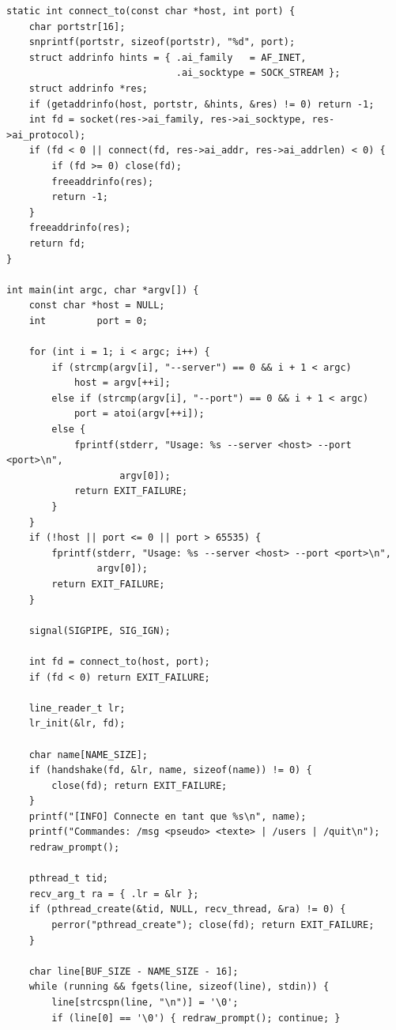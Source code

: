 \documentclass[12pt,a4paper]{article}
\begin{document}
\begin{lstlisting}[caption={\texttt{client.c}, client interactif du hub}]
static int connect_to(const char *host, int port) {
    char portstr[16];
    snprintf(portstr, sizeof(portstr), "%d", port);
    struct addrinfo hints = { .ai_family   = AF_INET,
                              .ai_socktype = SOCK_STREAM };
    struct addrinfo *res;
    if (getaddrinfo(host, portstr, &hints, &res) != 0) return -1;
    int fd = socket(res->ai_family, res->ai_socktype, res->ai_protocol);
    if (fd < 0 || connect(fd, res->ai_addr, res->ai_addrlen) < 0) {
        if (fd >= 0) close(fd);
        freeaddrinfo(res);
        return -1;
    }
    freeaddrinfo(res);
    return fd;
}

int main(int argc, char *argv[]) {
    const char *host = NULL;
    int         port = 0;

    for (int i = 1; i < argc; i++) {
        if (strcmp(argv[i], "--server") == 0 && i + 1 < argc)
            host = argv[++i];
        else if (strcmp(argv[i], "--port") == 0 && i + 1 < argc)
            port = atoi(argv[++i]);
        else {
            fprintf(stderr, "Usage: %s --server <host> --port <port>\n",
                    argv[0]);
            return EXIT_FAILURE;
        }
    }
    if (!host || port <= 0 || port > 65535) {
        fprintf(stderr, "Usage: %s --server <host> --port <port>\n",
                argv[0]);
        return EXIT_FAILURE;
    }

    signal(SIGPIPE, SIG_IGN);

    int fd = connect_to(host, port);
    if (fd < 0) return EXIT_FAILURE;

    line_reader_t lr;
    lr_init(&lr, fd);

    char name[NAME_SIZE];
    if (handshake(fd, &lr, name, sizeof(name)) != 0) {
        close(fd); return EXIT_FAILURE;
    }
    printf("[INFO] Connecte en tant que %s\n", name);
    printf("Commandes: /msg <pseudo> <texte> | /users | /quit\n");
    redraw_prompt();

    pthread_t tid;
    recv_arg_t ra = { .lr = &lr };
    if (pthread_create(&tid, NULL, recv_thread, &ra) != 0) {
        perror("pthread_create"); close(fd); return EXIT_FAILURE;
    }

    char line[BUF_SIZE - NAME_SIZE - 16];
    while (running && fgets(line, sizeof(line), stdin)) {
        line[strcspn(line, "\n")] = '\0';
        if (line[0] == '\0') { redraw_prompt(); continue; }


\end{lstlisting}
\end{document}
